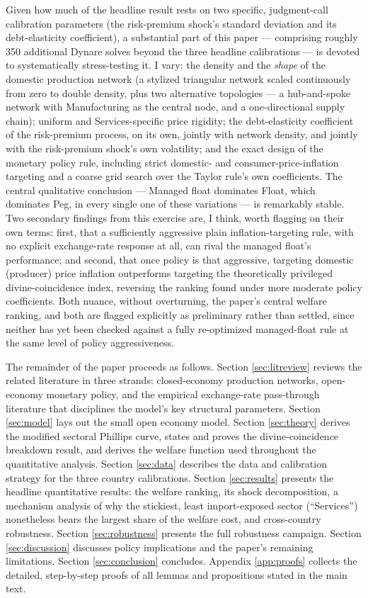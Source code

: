 \documentclass[12pt]{article}
\begin{document}
Given how much of the headline result rests on two specific, judgment-call calibration parameters
(the risk-premium shock's standard deviation and its debt-elasticity coefficient), a substantial part
of this paper --- comprising roughly 350 additional Dynare solves beyond the three headline
calibrations --- is devoted to systematically stress-testing it. I vary: the density and the
\emph{shape} of the domestic production network (a stylized triangular network scaled continuously
from zero to double density, plus two alternative topologies --- a hub-and-spoke network with
Manufacturing as the central node, and a one-directional supply chain); uniform and Services-specific
price rigidity; the debt-elasticity coefficient of the risk-premium process, on its own, jointly with
network density, and jointly with the risk-premium shock's own volatility; and the exact design of the
monetary policy rule, including strict domestic- and consumer-price-inflation targeting and a
coarse grid search over the Taylor rule's own coefficients. The central qualitative conclusion ---
Managed float dominates Float, which dominates Peg, in every single one of these variations --- is
remarkably stable. Two secondary findings from this exercise are, I think, worth flagging on their own
terms: first, that a sufficiently aggressive plain inflation-targeting rule, with no explicit
exchange-rate response at all, can rival the managed float's performance; and second, that once
policy is that aggressive, targeting domestic (producer) price inflation outperforms targeting the
theoretically privileged divine-coincidence index, reversing the ranking found under more moderate
policy coefficients. Both nuance, without overturning, the paper's central welfare ranking, and both
are flagged explicitly as preliminary rather than settled, since neither has yet been checked against
a fully re-optimized managed-float rule at the same level of policy aggressiveness.

The remainder of the paper proceeds as follows. Section \ref{sec:litreview} reviews the related
literature in three strands: closed-economy production networks, open-economy monetary policy, and
the empirical exchange-rate pass-through literature that disciplines the model's key structural
parameters. Section \ref{sec:model} lays out the small open economy model. Section
\ref{sec:theory} derives the modified sectoral Phillips curve, states and proves the divine-coincidence
breakdown result, and derives the welfare function used throughout the quantitative analysis.
Section \ref{sec:data} describes the data and calibration strategy for the three country
calibrations. Section \ref{sec:results} presents the headline quantitative results: the welfare
ranking, its shock decomposition, a mechanism analysis of why the stickiest, least import-exposed
sector (``Services'') nonetheless bears the largest share of the welfare cost, and cross-country
robustness. Section \ref{sec:robustness} presents the full robustness campaign. Section
\ref{sec:discussion} discusses policy implications and the paper's remaining limitations. Section
\ref{sec:conclusion} concludes. Appendix \ref{app:proofs} collects the detailed, step-by-step proofs
of all lemmas and propositions stated in the main text.
\end{document}
